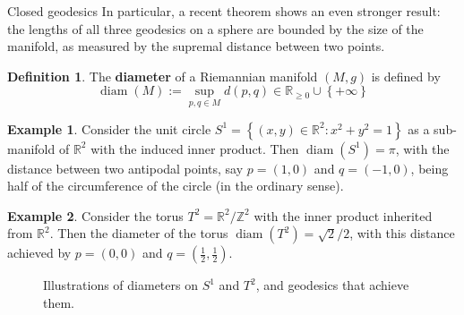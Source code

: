 \documentclass{article}
\newcommand{\set}[1]{\left\{#1\right\}}
\theoremstyle{definition}
\newtheorem{definition}{Definition}[section]
\newtheorem{example}{Example}[section]
\theoremstyle{remark}
\begin{document}
\begin{section}{Closed geodesics}
  In particular, a recent theorem shows an even stronger result: the
  lengths of all three geodesics on a sphere are bounded by the size of
  the manifold, as measured by the supremal distance between two points.
  \begin{definition} %
    The \textbf{diameter} of a Riemannian manifold $(M, g)$ is defined by \[
      \operatorname{diam}(M) := \sup_{p, q\in M} d(p, q) \in \mathbb R_{\geq 0} \cup \set{+\infty}
    \]
  \end{definition}
  \begin{example} %
    Consider the unit circle $S^1 = \set{(x, y) \in \mathbb R^2 : x^2 + y^2 = 1}$
    as a sub-manifold of $\mathbb R^2$ with the induced inner product.
    Then $\operatorname{diam}(S^1) = \pi$, with the distance between two antipodal
    points, say $p = (1, 0)$ and $q = (-1, 0)$, being half of the circumference
    of the circle (in the ordinary sense).
  \end{example}
  \begin{example} %
    Consider the torus $T^2 = \mathbb R^2/\mathbb Z^2$ with the inner product
    inherited from $\mathbb R^2$. Then the diameter of the torus
    $\operatorname{diam}(T^2) = \sqrt{2}/2$, with this distance achieved by
    $p = (0, 0)$ and $q = (\frac 12, \frac 12)$.
  \end{example}
  \begin{figure}[ht]
    
    \caption{Illustrations of diameters on $S^1$ and $T^2$, and geodesics
    that achieve them.}
  \end{figure}


\end{section}
\end{document}
